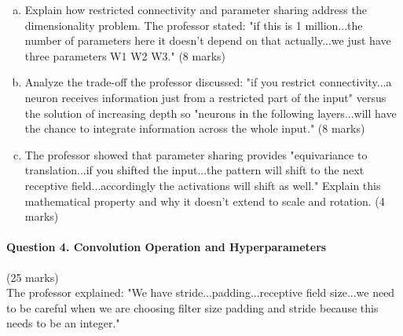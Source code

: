 \documentclass[12pt]{article}
\newcommand{\shortanswer}{\vspace{2cm}}
\newcommand{\mediumanswer}{\vspace{3cm}}
\begin{document}
\begin{enumerate}[(a)]
    \item Explain how restricted connectivity and parameter sharing address the dimensionality problem. The professor stated: "if this is 1 million...the number of parameters here it doesn't depend on that actually...we just have three parameters W1 W2 W3." \hfill (8 marks)
    
    \mediumanswer
    
    \item Analyze the trade-off the professor discussed: "if you restrict connectivity...a neuron receives information just from a restricted part of the input" versus the solution of increasing depth so "neurons in the following layers...will have the chance to integrate information across the whole input." \hfill (8 marks)
    
    \mediumanswer
    
    \item The professor showed that parameter sharing provides "equivariance to translation...if you shifted the input...the pattern will shift to the next receptive field...accordingly the activations will shift as well." Explain this mathematical property and why it doesn't extend to scale and rotation. \hfill (4 marks)
    
    \shortanswer
\end{enumerate}

\newpage
\paragraph{Question 4. Convolution Operation and Hyperparameters}{\hfill (25 marks)}\\
The professor explained: "We have stride...padding...receptive field size...we need to be careful when we are choosing filter size padding and stride because this needs to be an integer."
\end{document}
